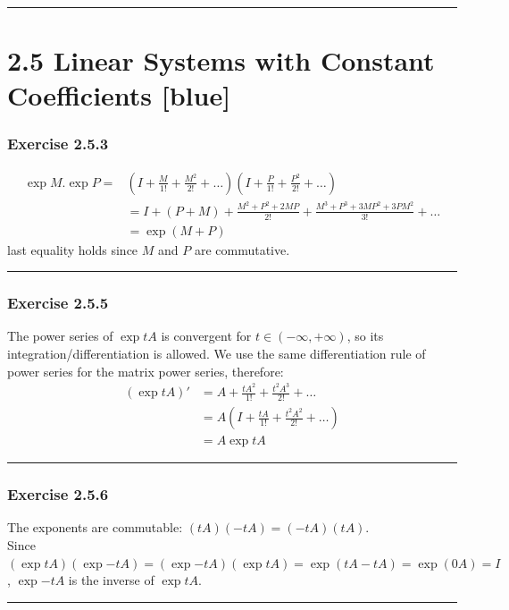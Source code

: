 \documentclass[12pt, letterpaper]{scrartcl}
\begin{document}
\vskip1mm\hrule
\clearpage


\section*{2.5 Linear Systems with Constant Coefficients \xrfill[2pt]{3pt}[blue]}

\subsubsection*{Exercise 2.5.3}
\begin{align*}
    \exp{M}.\exp{P}=&(I+\frac{M}{1!}+\frac{M^2}{2!}+\dots)(I+\frac{P}{1!}+\frac{P^2}{2!}+\dots)\\
    &=I+(P+M)+\frac{M^2+P^2+2MP}{2!}+\frac{M^3+P^3+3MP^2+3PM^2}{3!}+\dots\\
    &=\exp{(M+P)}
\end{align*}
last equality holds since $M$ and $P$ are commutative.
\vskip1mm\hrule

\subsubsection*{Exercise 2.5.5}
The power series of $\exp{tA}$ is convergent for $t\in(-\infty,+\infty)$, so its integration/differentiation is allowed. We use the same differentiation rule of power series for the matrix power series, therefore:
\begin{align*}
    (\exp{tA})'&=A+\frac{tA^2}{1!}+\frac{t^2A^3}{2!}+\dots\\
    &=A(I+\frac{tA}{1!}+\frac{t^2A^2}{2!}+\dots)\\
    &=A\exp{tA}
\end{align*}
\vskip1mm\hrule

\subsubsection*{Exercise 2.5.6}
The exponents are commutable: $(tA)(-tA)=(-tA)(tA)$.
\\
Since $(\exp{tA})(\exp{-tA})=(\exp{-tA})(\exp{tA})=\exp(tA-tA)=\exp(0A)=I$, $\exp{-tA}$ is the inverse of $\exp{tA}$.
\vskip1mm\hrule
\clearpage
\end{document}
